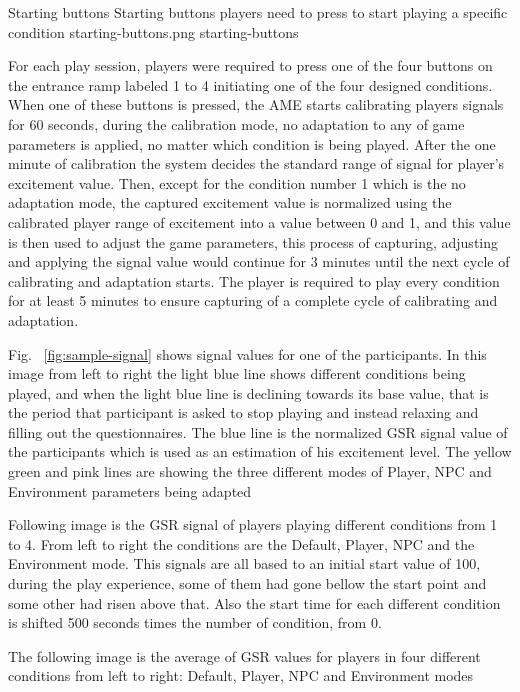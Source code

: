 \largeimg
{Starting buttons}
{Starting buttons players need to press to start playing a specific condition}
{starting-buttons.png}
{starting-buttons}

For each play session, players were required to press one of the four buttons on the entrance ramp labeled 1 to 4 initiating one of the four designed conditions. When one of these buttons is pressed, the AME starts calibrating players signals for 60 seconds, during the calibration mode, no adaptation to any of game parameters is applied, no matter which condition is being played. After the one minute of calibration the system decides the standard range of signal for player's excitement value. Then, except for the condition number 1 which is the no adaptation mode, the captured excitement value is normalized using the calibrated player range of excitement into a value between 0 and 1, and this value is then used to adjust the game parameters, this process of capturing, adjusting and applying the signal value would continue for 3 minutes until the next cycle of calibrating and adaptation starts. The player is required to play every condition for at least 5 minutes to ensure capturing of a complete cycle of calibrating and adaptation.

Fig. ~\ref{fig:sample-signal} shows signal values for one of the participants. In this image from left to right the light blue line shows different conditions being played, and when the light blue line is declining towards its base value, that is the period that participant is asked to stop playing and instead relaxing and filling out the questionnaires. The blue line is the normalized GSR signal value of the participants which is used as an estimation of his excitement level. The yellow green and pink lines are showing the three different modes of Player, NPC and Environment parameters being adapted

Following image is the GSR signal of players playing different conditions from 1 to 4. From left to right the conditions are the Default, Player, NPC and the Environment mode. This signals are all based to an initial start value of 100, during the play experience, some of them had gone bellow the start point and some other had risen above that. Also the start time for each different condition is shifted 500 seconds times the number of condition, from 0.

The following image is the average of GSR values for players in four different conditions from left to right: Default, Player, NPC and Environment modes

